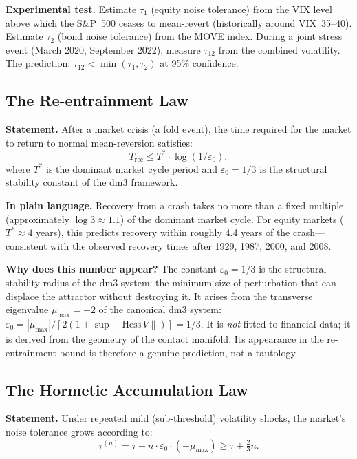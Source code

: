 \documentclass[12pt, oneside]{book}
\theoremstyle{plain}
\theoremstyle{definition}
\theoremstyle{remark}
\begin{document}
\textbf{Experimental test.}
Estimate $\tau_1$ (equity noise tolerance) from the VIX level
above which the S\&P~500 ceases to mean-revert (historically
around VIX~35--40). Estimate $\tau_2$ (bond noise tolerance)
from the MOVE index. During a joint stress event (March 2020,
September 2022), measure $\tau_{12}$ from the combined
volatility. The prediction: $\tau_{12} < \min(\tau_1, \tau_2)$
at 95\% confidence.

\subsection{The Re-entrainment Law}

\textbf{Statement.} After a market crisis (a fold event), the
time required for the market to return to normal mean-reversion
satisfies:
\begin{equation}
T_{\mathrm{rec}} \leq T^* \cdot \log(1/\varepsilon_0),
\end{equation}
where $T^*$ is the dominant market cycle period and $\varepsilon_0
= 1/3$ is the structural stability constant of the dm3 framework.

\textbf{In plain language.} Recovery from a crash takes no more
than a fixed multiple (approximately $\log 3 \approx 1.1$) of
the dominant market cycle. For equity markets ($T^* \approx 4$
years), this predicts recovery within roughly 4.4 years of the
crash---consistent with the observed recovery times after 1929,
1987, 2000, and 2008.

\textbf{Why does this number appear?} The constant
$\varepsilon_0 = 1/3$ is the structural stability radius
of the dm3 system: the minimum size of perturbation that
can displace the attractor without destroying it. It arises
from the transverse eigenvalue $\mu_{\max} = -2$ of the
canonical dm3 system:
$\varepsilon_0 = |\mu_{\max}| / [2(1 + \sup \|\mathrm{Hess}\,V\|)] = 1/3$.
It is \emph{not} fitted to financial data; it is derived from the
geometry of the contact manifold. Its appearance in the
re-entrainment bound is therefore a genuine prediction, not
a tautology.

\subsection{The Hormetic Accumulation Law}

\textbf{Statement.} Under repeated mild (sub-threshold) volatility
shocks, the market's noise tolerance grows according to:
\begin{equation}
\tau^{(n)} = \tau + n \cdot \varepsilon_0 \cdot (-\mu_{\max})
\geq \tau + \tfrac{2}{3} n.
\end{equation}
\end{document}
